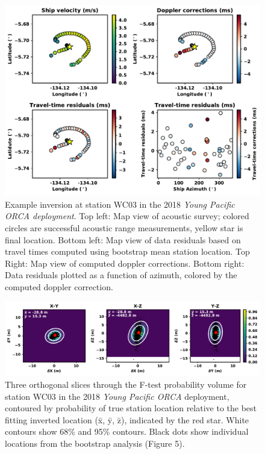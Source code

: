 \documentclass[titlepage, 12pt]{article}
\begin{document}
  \begin{figure}[!htb]
   \includegraphics[width=\linewidth]{tt_resids.pdf}
   \caption{Example inversion at station WC03 in the 2018 \textit{Young Pacific ORCA deployment}. Top left: Map view of acoustic survey; colored circles are successful acoustic range measurements, yellow star is final location. Bottom left: Map view of data residuals based on travel times computed using bootstrap mean station location. Top Right: Map view of computed doppler corrections. Bottom right: Data residuals plotted as a function of azimuth, colored by the computed doppler correction.}
  \end{figure}
  
  \begin{figure}[!htb]
   \includegraphics[width=\linewidth]{ftest.pdf}
   \caption{Three orthogonal slices through the F-test probability volume for station WC03 in the 2018 \textit{Young Pacific ORCA} deployment, contoured by probability of true station location relative to the best fitting inverted location (x̄, ȳ, z̄), indicated by the red star. White contours show 68\% and 95\% contours. Black dots show individual locations from the bootstrap analysis (Figure 5).}
  \end{figure}
  
\end{document}
